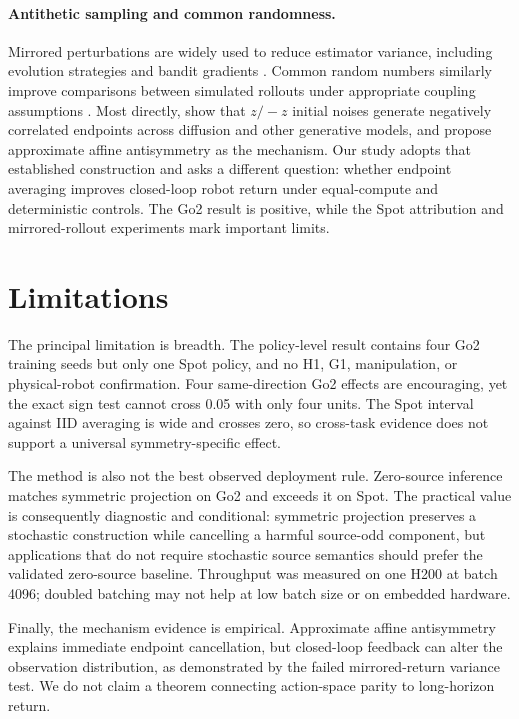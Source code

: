 \documentclass{article}
\begin{document}
\paragraph{Antithetic sampling and common randomness.}
Mirrored perturbations are widely used to reduce estimator variance, including
evolution strategies and bandit gradients
\citep{salimans2017es,yu2018antithetic}. Common random numbers similarly improve
comparisons between simulated rollouts under appropriate coupling assumptions
\citep{yadav2026crn}. Most directly, \citet{jia2025antithetic} show that $z/-z$
initial noises generate negatively correlated endpoints across diffusion and
other generative models, and propose approximate affine antisymmetry as the
mechanism. Our study adopts that established construction and asks a different
question: whether endpoint averaging improves closed-loop robot return under
equal-compute and deterministic controls. The Go2 result is positive, while
the Spot attribution and mirrored-rollout experiments mark important limits.

\section{Limitations}

The principal limitation is breadth. The policy-level result contains four
Go2 training seeds but only one Spot policy, and no H1, G1, manipulation, or
physical-robot confirmation. Four same-direction Go2 effects are encouraging,
yet the exact sign test cannot cross 0.05 with only four units. The Spot
interval against IID averaging is wide and crosses zero, so cross-task evidence
does not support a universal symmetry-specific effect.

The method is also not the best observed deployment rule. Zero-source inference
matches symmetric projection on Go2 and exceeds it on Spot. The practical value
is consequently diagnostic and conditional: symmetric projection preserves a
stochastic construction while cancelling a harmful source-odd component, but
applications that do not require stochastic source semantics should prefer the
validated zero-source baseline. Throughput was measured on one H200 at batch
4096; doubled batching may not help at low batch size or on embedded hardware.

Finally, the mechanism evidence is empirical. Approximate affine antisymmetry
explains immediate endpoint cancellation, but closed-loop feedback can alter
the observation distribution, as demonstrated by the failed mirrored-return
variance test. We do not claim a theorem connecting action-space parity to
long-horizon return.
\end{document}
